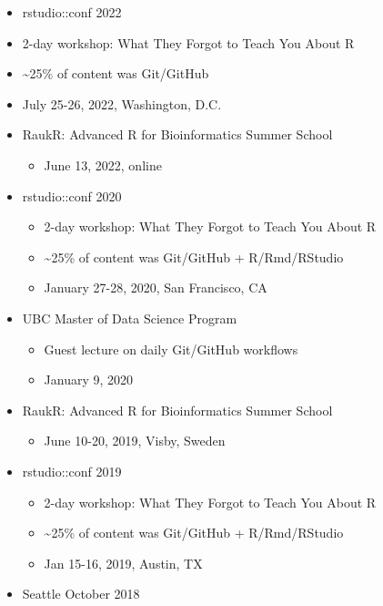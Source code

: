 \documentclass[
]{book}
\providecommand{\tightlist}{%
  \setlength{\itemsep}{0pt}\setlength{\parskip}{0pt}}
\begin{document}
\begin{itemize}
\tightlist
\item
  rstudio::conf 2022
\item
  2-day workshop: What They Forgot to Teach You About R\\
\item
  \textasciitilde25\% of content was Git/GitHub
\item
  July 25-26, 2022, Washington, D.C.
\item
  RaukR: Advanced R for Bioinformatics Summer School

  \begin{itemize}
  \tightlist
  \item
    June 13, 2022, online
  \end{itemize}
\item
  rstudio::conf 2020

  \begin{itemize}
  \tightlist
  \item
    2-day workshop: What They Forgot to Teach You About R\\
  \item
    \textasciitilde25\% of content was Git/GitHub + R/Rmd/RStudio\\
  \item
    January 27-28, 2020, San Francisco, CA
  \end{itemize}
\item
  UBC Master of Data Science Program

  \begin{itemize}
  \tightlist
  \item
    Guest lecture on daily Git/GitHub workflows
  \item
    January 9, 2020
  \end{itemize}
\item
  RaukR: Advanced R for Bioinformatics Summer School

  \begin{itemize}
  \tightlist
  \item
    June 10-20, 2019, Visby, Sweden
  \end{itemize}
\item
  rstudio::conf 2019

  \begin{itemize}
  \tightlist
  \item
    2-day workshop: What They Forgot to Teach You About R\\
  \item
    \textasciitilde25\% of content was Git/GitHub + R/Rmd/RStudio\\
  \item
    Jan 15-16, 2019, Austin, TX
  \end{itemize}
\item
  Seattle October 2018


\end{itemize}
\end{document}
